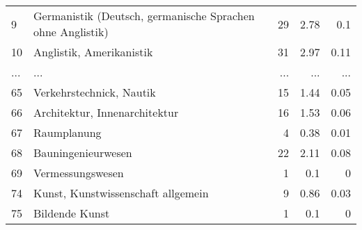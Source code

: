 \begin{longtable}{lXrrr}
        9 & \multicolumn{1}{X}{Germanistik (Deutsch, germanische Sprachen ohne Anglistik)} & %
          \num{29} &
          \num[round-mode=places,round-precision=2]{2.78} &
          \num[round-mode=places,round-precision=2]{0.1} \\
        10 & \multicolumn{1}{X}{Anglistik, Amerikanistik} & %
          \num{31} &
          \num[round-mode=places,round-precision=2]{2.97} &
          \num[round-mode=places,round-precision=2]{0.11} \\
       ... & ... & ... & ... & ... \\
        65 & \multicolumn{1}{X}{Verkehrstechnick, Nautik} & %
          \num{15} &
          \num[round-mode=places,round-precision=2]{1.44} &
          \num[round-mode=places,round-precision=2]{0.05} \\

        66 & \multicolumn{1}{X}{Architektur, Innenarchitektur} & %
          \num{16} &
          \num[round-mode=places,round-precision=2]{1.53} &
          \num[round-mode=places,round-precision=2]{0.06} \\

        67 & \multicolumn{1}{X}{Raumplanung} & %
          \num{4} &
          \num[round-mode=places,round-precision=2]{0.38} &
          \num[round-mode=places,round-precision=2]{0.01} \\

        68 & \multicolumn{1}{X}{Bauningenieurwesen} & %
          \num{22} &
          \num[round-mode=places,round-precision=2]{2.11} &
          \num[round-mode=places,round-precision=2]{0.08} \\

        69 & \multicolumn{1}{X}{Vermessungswesen} & %
          \num{1} &
          \num[round-mode=places,round-precision=2]{0.1} &
          \num[round-mode=places,round-precision=2]{0} \\

        74 & \multicolumn{1}{X}{Kunst, Kunstwissenschaft allgemein} & %
          \num{9} &
          \num[round-mode=places,round-precision=2]{0.86} &
          \num[round-mode=places,round-precision=2]{0.03} \\

        75 & \multicolumn{1}{X}{Bildende Kunst} & %
          \num{1} &
          \num[round-mode=places,round-precision=2]{0.1} &
          \num[round-mode=places,round-precision=2]{0} \\


\end{longtable}
